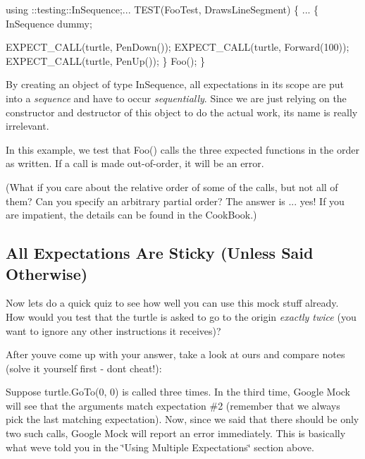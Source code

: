 \begin{DoxyCode}
using ::testing::InSequence;...
TEST(FooTest, DrawsLineSegment) \{
  ...
  \{
    InSequence dummy;

    EXPECT\_CALL(turtle, PenDown());
    EXPECT\_CALL(turtle, Forward(100));
    EXPECT\_CALL(turtle, PenUp());
  \}
  Foo();
\}
\end{DoxyCode}


By creating an object of type {\ttfamily In\+Sequence}, all expectations in its scope are put into a {\itshape sequence} and have to occur {\itshape sequentially}. Since we are just relying on the constructor and destructor of this object to do the actual work, its name is really irrelevant.

In this example, we test that {\ttfamily Foo()} calls the three expected functions in the order as written. If a call is made out-\/of-\/order, it will be an error.

(What if you care about the relative order of some of the calls, but not all of them? Can you specify an arbitrary partial order? The answer is ... yes! If you are impatient, the details can be found in the Cook\+Book.)

\subsection*{All Expectations Are Sticky (Unless Said Otherwise)}

Now let\textquotesingle{}s do a quick quiz to see how well you can use this mock stuff already. How would you test that the turtle is asked to go to the origin {\itshape exactly twice} (you want to ignore any other instructions it receives)?

After you\textquotesingle{}ve come up with your answer, take a look at ours and compare notes (solve it yourself first -\/ don\textquotesingle{}t cheat!)\+:




Suppose {\ttfamily turtle.\+Go\+To(0, 0)} is called three times. In the third time, Google Mock will see that the arguments match expectation \#2 (remember that we always pick the last matching expectation). Now, since we said that there should be only two such calls, Google Mock will report an error immediately. This is basically what we\textquotesingle{}ve told you in the \char`\"{}\+Using Multiple Expectations\char`\"{} section above.

